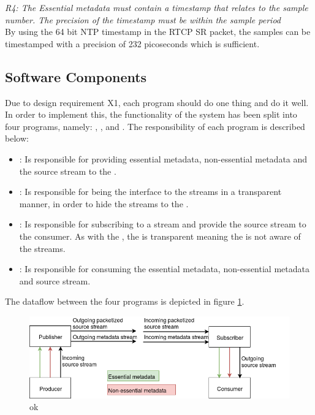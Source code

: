 \noindent \textit{R4: The Essential metadata must contain a timestamp that relates to the sample number. The precision of the timestamp must be within the sample period}\\
By using the 64 bit NTP timestamp in the RTCP SR packet, the samples can be timestamped with a precision of 232 picoseconds\citep{RFC5905} which is sufficient.



\subsection{Software Components}
Due to design requirement X1, each program should do one thing and do it well.
In order to implement this, the functionality of the system has been split into four programs, namely: \pub{}, \sub{}, \pro{} and \con{}. The responsibility of each program is described below:

\begin{itemize}
	\item \pro: Is responsible for providing essential metadata, non-essential metadata and the source stream to the \pub.
	
	\item \pub: Is responsible for being the interface to the streams in a transparent manner, in order to hide the streams to the \pro. 
	
	\item \sub: Is responsible for subscribing to a stream and provide the source stream to the consumer. As with the \pub, the \sub is transparent meaning the \con is not aware of the streams. 
	
	\item \con: Is responsible for consuming the essential metadata, non-essential metadata and source stream.
\end{itemize}

The dataflow between the four programs is depicted in figure \ref{fig:design:pubsub}.
\begin{figure}[H]
	\centering
	\includegraphics[width=1\textwidth]{figures/publisher-subscriber}
	\caption{ok} \label{fig:design:pubsub}
\end{figure}


